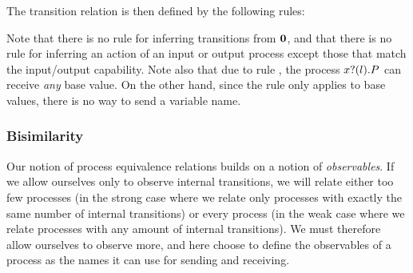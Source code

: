The transition relation is then defined by the following rules:
Note that there is no rule for inferring transitions from \( \bm{0} \), and that there is no rule for inferring an action of an input or output process except those that match the input/output capability.
Note also that due to rule , the process \( x ? (l) . P \) can receive \emph{any} base value.
On the other hand, since the rule  only applies to base values, there is no way to send a variable name.


\subsubsection{Bisimilarity}
Our notion of process equivalence relations builds on a notion of \emph{observables}.
If we allow ourselves only to observe internal transitions, we will relate either too few processes (in the strong case where we relate only processes with exactly the same number of internal transitions) or every process (in the weak case where we relate processes with any amount of internal transitions).
We must therefore allow ourselves to observe more, and here choose to define the observables of a process as the names it can use for sending and receiving.

